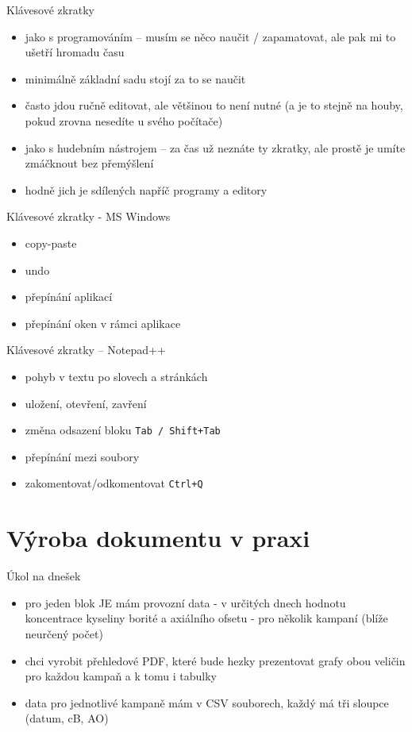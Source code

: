 \documentclass{beamer}
\begin{document}
\begin{frame}{Klávesové zkratky}
  \begin{itemize}
    \item jako s programováním -- musím se něco naučit / zapamatovat, ale pak mi to ušetří hromadu času
    \item minimálně základní sadu stojí za to se naučit
    \item často jdou ručně editovat, ale většinou to není nutné (a je to stejně na houby, pokud zrovna nesedíte u svého počítače)
    \item jako s hudebním nástrojem -- za čas už neznáte ty zkratky, ale prostě je umíte zmáčknout bez přemýšlení
    \item hodně jich je sdílených napříč programy a editory
  \end{itemize}
\end{frame}

\begin{frame}{Klávesové zkratky - MS Windows}
  \begin{itemize}
    \item copy-paste
    \item undo
    \item přepínání aplikací
    \item přepínání oken v rámci aplikace
  \end{itemize}
\end{frame}

\begin{frame}{Klávesové zkratky -- Notepad++}
  \begin{itemize}
    \item pohyb v textu po slovech a stránkách
    \item uložení, otevření, zavření
    \item změna odsazení bloku \texttt{Tab / Shift+Tab}
    \item přepínání mezi soubory
    \item zakomentovat/odkomentovat \texttt{Ctrl+Q}
  \end{itemize}
\end{frame}

\section{Výroba dokumentu v praxi}

\begin{frame}{Úkol na dnešek}
  \begin{itemize}
    \item pro jeden blok JE mám provozní data - v určitých dnech hodnotu koncentrace kyseliny borité a axiálního ofsetu - pro několik kampaní (blíže neurčený počet)
    \item chci vyrobit přehledové PDF, které bude hezky prezentovat grafy obou veličin pro každou kampaň a k tomu i tabulky
    \item data pro jednotlivé kampaně mám v CSV souborech, každý má tři sloupce (datum, cB, AO)
  \end{itemize}
\end{frame}
\end{document}
